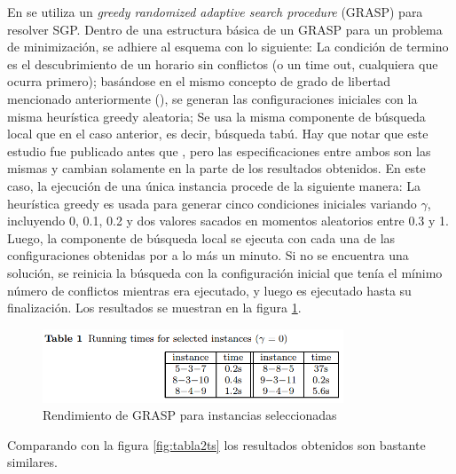 \documentclass[letter, 10pt]{article}
\begin{document}
En \cite{triska2008solving} se utiliza un \textit{greedy randomized adaptive search procedure} (GRASP) para resolver SGP. Dentro de una estructura básica de un GRASP para un problema de minimización, se adhiere al esquema con lo siguiente: La condición de termino es el descubrimiento de un horario sin conflictos (o un time out, cualquiera que ocurra primero); basándose en el mismo concepto de grado de libertad mencionado anteriormente (\cite{triska2012effective}), se generan las configuraciones iniciales con la misma heurística greedy aleatoria; Se usa la misma componente de búsqueda local que en el caso anterior, es decir, búsqueda tabú. Hay que notar que este estudio fue publicado antes que \cite{triska2012effective}, pero las especificaciones entre ambos son las mismas y cambian solamente en la parte de los resultados obtenidos. En este caso, la ejecución de una única instancia procede de la siguiente manera: La heurística greedy es usada para generar cinco condiciones iniciales variando $\gamma$, incluyendo 0, 0.1, 0.2 y dos valores sacados en momentos aleatorios entre 0.3 y 1. Luego, la componente de búsqueda local se ejecuta con cada una de las configuraciones obtenidas por a lo más un minuto. Si no se encuentra una solución, se reinicia la búsqueda con la configuración inicial que tenía el mínimo número de conflictos mientras era ejecutado, y luego es ejecutado hasta su finalización. Los resultados se muestran en la figura \ref{fig:grasptriska}. 

\begin{figure}[h]
    \centering
    \includegraphics[width=0.8\textwidth]{figures/table4_grasp.png}
    \caption{Rendimiento de GRASP para instancias seleccionadas}
    \label{fig:grasptriska}
\end{figure}

Comparando con la figura \ref{fig:tabla2ts} los resultados obtenidos son bastante similares.
\end{document}
